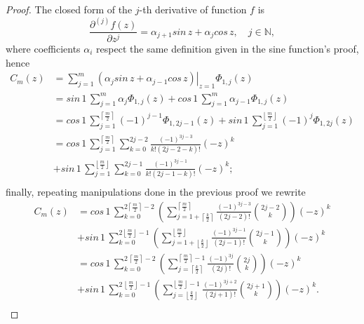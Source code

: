 \begin{proof}
The closed form of the $j$-th derivative of function $f$ is
$$\frac{\partial^{(j)}{f}(z)}{\partial{z}^{j}} = \alpha_{j+1}sin\,{z} +
\alpha_{j}cos\,{z}, \quad j\in\mathbb{N},$$ where coefficients $\alpha_{i}$
respect the same definition given in the sine function's proof, hence 
\begin{displaymath}
\begin{split}
  C_{m}(z) &= \sum_{j=1}^{m}{ \left. \left(\alpha_{j}sin\,{z} + \alpha_{j-1}cos\,{z}\right) \right|_{z=1}\Phi_{1,j}(z)} \\
       &= sin\,{1}\,\sum_{j=1}^{m}{ \alpha_{j}\Phi_{1,j}(z)} + cos\,{1}\,\sum_{j=1}^{m}{ \alpha_{j-1}\Phi_{1,j}(z)} \\
       &= cos\,{1}\,\sum_{j=1}^{\left\lceil \frac{m}{2} \right\rceil}{ (-1)^{j-1}\Phi_{1,2j-1}(z)} 
        + sin\,{1}\,\sum_{j=1}^{\left\lfloor \frac{m}{2} \right\rfloor}{ (-1)^{j}\Phi_{1,2j}(z)} \\
       &= cos\,{1}\,\sum_{j=1}^{\left\lceil \frac{m}{2} \right\rceil}{\sum_{k=0}^{2j-2}{ \frac{(-1)^{3j-3}}{k!(2j-2-k)!}{(-z)^{k}}} }\\
       &+ sin\,{1}\,\sum_{j=1}^{\left\lfloor \frac{m}{2} \right\rfloor}{\sum_{k=0}^{2j-1}{ \frac{(-1)^{3j-1}}{k!(2j-1-k)!}{(-z)^{k}}}}; \\
\end{split}
\end{displaymath}
finally, repeating manipulations done in the previous proof we rewrite
\begin{displaymath}
\begin{split}
  C_{m}(z)  &= cos\,{1}\,\sum_{k=0}^{2 \left\lceil \frac{m}{2} \right\rceil-2}{\left(\sum_{j=1+\left\lceil \frac{k}{2}\right\rceil}^{\left\lceil \frac{m}{2} \right\rceil}{\frac{(-1)^{3j-3}}{(2j-2)!}{2j-2\choose k}}\right) {(-z)^{k}}}\\
            &+ sin\,{1}\,\sum_{k=0}^{2 \left\lfloor \frac{m}{2} \right\rfloor-1}{\left(\sum_{j=1+\left\lfloor \frac{k}{2}\right\rfloor}^{\left\lfloor \frac{m}{2} \right\rfloor}{ \frac{(-1)^{3j-1}}{(2j-1)!} {2j-1\choose k}}\right){(-z)^{k}}} \\
            &= cos\,{1}\,\sum_{k=0}^{2\,\left\lceil \frac{m}{2} \right\rceil-2}{\left(\sum_{j=\left\lceil \frac{k}{2}\right\rceil}^{\left\lceil \frac{m}{2} \right\rceil -1}{\frac{(-1)^{3j}}{(2j)!}{2j\choose k}}\right) {(-z)^{k}}}\\
            &+ sin\,{1}\,\sum_{k=0}^{2\,\left\lfloor \frac{m}{2} \right\rfloor-1}{\left(\sum_{j=\left\lfloor \frac{k}{2}\right\rfloor}^{\left\lfloor \frac{m}{2} \right\rfloor -1}{\frac{(-1)^{3j+2}}{(2j + 1)!} {2j+1\choose k}}\right){(-z)^{k}}}. \\
\end{split}
\end{displaymath}
\end{proof}

